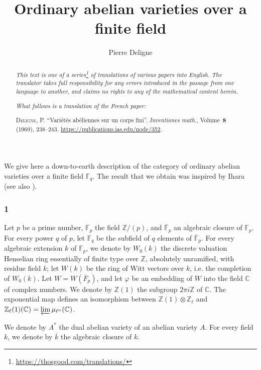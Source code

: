 \documentclass{article}
\title{Ordinary abelian varieties over a finite field}
\author{Pierre Deligne}
\date{}
\newcommand{\FF}{\mathbb{F}}
\newcommand{\ZZ}{\mathbb{Z}}
\newcommand{\CC}{\mathbb{C}}
\newcommand{\oldpage}[1]{\marginpar{\footnotesize$\Big\vert$ \textit{p.~#1}}}
\begin{document}
\maketitle
\thispagestyle{fancy}

\renewcommand{\abstractname}{Translator's note.}

\begin{abstract}
  \renewcommand*{\thefootnote}{\fnsymbol{footnote}}
  \emph{This text is one of a series\footnote{\url{https://thosgood.com/translations/}} of translations of various papers into English.}
  \emph{The translator takes full responsibility for any errors introduced in the passage from one language to another, and claims no rights to any of the mathematical content herein.}
  
  \emph{What follows is a translation of the French paper:}

  \medskip\noindent
  \textsc{Deligne, P.}
  ``Vari\'{e}t\'{e}s ab\'{e}liennes sur un corps fini''.
  \emph{Inventiones math.}, Volume~\textbf{8} (1969), 238--243.
  {\url{https://publications.ias.edu/node/352}}.
\end{abstract}

\setcounter{footnote}{0}



\oldpage{238}
We give here a down-to-earth description of the category of ordinary abelian varieties over a finite field $\FF_q$.
The result that we obtain was inspired by Ihara~\cite[ch.~V]{2} (see also \cite{3}).


\subsubsection*{1}
\label{1}
Let $p$ be a prime number, $\FF_p$ the field $\ZZ/(p)$, and $\overline{\FF}_p$ an algebraic closure of $\FF_p$.
For every power $q$ of $p$, let $\FF_q$ be the subfield of $q$ elements of $\overline{\FF}_p$.
For every algebraic extension $k$ of $\FF_p$, we denote by $W_0(k)$ the discrete valuation Henselian ring essentially of finite type over $\ZZ$, absolutely unramified, with residue field $k$;
let $W(k)$ be the ring of Witt vectors over $k$, i.e. the completion of $W_0(k)$.
Let $W=W(\overline{F}_p)$, and let $\varphi$ be an embedding of $W$ into the field $\CC$ of complex numbers.
We denote by $\ZZ(1)$ the subgroup $2\pi i\ZZ$ of $\CC$.
The exponential map defines an isomorphism between $\ZZ(1)\otimes\ZZ_\ell$ and $\ZZ_\ell(1)(\CC)=\varprojlim\mu_{\ell^n}(\CC)$.

We denote by $A^*$ the dual abelian variety of an abelian variety $A$.
For every field $k$, we denote by $\overline{k}$ the algebraic closure of $k$.
\end{document}
